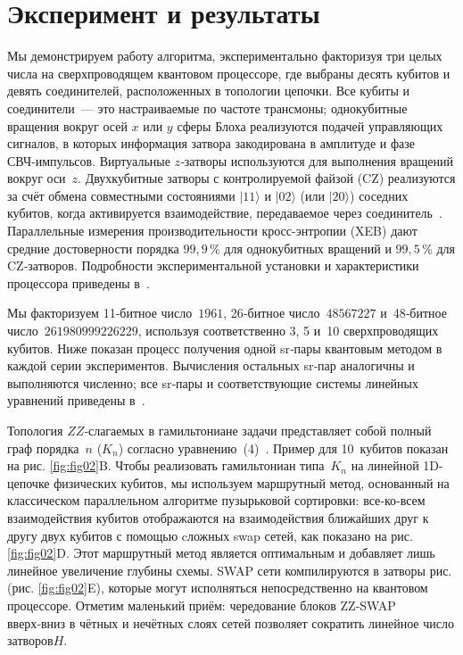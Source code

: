 \section{Эксперимент и результаты}

Мы демонстрируем работу алгоритма, экспериментально факторизуя три целых числа
на сверхпроводящем квантовом процессоре, где выбраны десять кубитов и девять
соединителей, расположенных в топологии цепочки. Все кубиты и соединители — это
настраиваемые по частоте трансмоны; однокубитные вращения вокруг осей $x$ или
$y$ сферы Блоха реализуются подачей управляющих сигналов, в которых информация
затвора закодирована в амплитуде и фазе СВЧ‑импульсов. Виртуальные $z$‑затворы
используются для выполнения вращений вокруг оси $z$. Двухкубитные затворы с
контролируемой файзой (CZ) реализуются за счёт обмена совместными состояниями
$|11\rangle$ и $|02\rangle$ (или $|20\rangle$) соседних кубитов, когда
активируется взаимодействие, передаваемое через соединитель \cite{cite_34}.
Параллельные измерения производительности кросс-энтропии (XEB) дают средние
достоверности порядка $99{,}9\,\%$ для однокубитных вращений и $99{,}5\,\%$ для
CZ‑затворов. Подробности экспериментальной установки и характеристики
процессора приведены в \cite{cite_31}.

Мы факторизуем 11‑битное число $1961$, 26‑битное число $48567227$ и 48‑битное
число $261980999226229$, используя соответственно 3, 5 и 10 сверхпроводящих
кубитов. Ниже показан процесс получения одной sr‑пары квантовым методом в
каждой серии экспериментов. Вычисления остальных sr‑пар аналогичны и
выполняются численно; все sr‑пары и соответствующие системы линейных уравнений
приведены в \cite{cite_31}.

Топология $ZZ$‑слагаемых в гамильтониане задачи представляет собой полный граф
порядка $n$ ($K_n$) согласно уравнению (4) \cite{cite_31}. Пример для
10 кубитов показан на рис. \ref{fig:fig02}B. Чтобы реализовать гамильтониан
типа $K_n$ на линейной 1D-цепочке физических кубитов, мы используем маршрутный
метод, основанный на классическом параллельном алгоритме пузырьковой
сортировки: все‑ко‑всем взаимодействия кубитов отображаются на взаимодействия
ближайших друг к другу двух кубитов с помощью cложных swap сетей, как показано
на рис. \ref{fig:fig02}D. Этот маршрутный метод является оптимальным и
добавляет лишь линейное увеличение глубины схемы. SWAP сети компилируются в
затворы рис. (рис. \ref{fig:fig02}E), которые могут исполняться непосредственно
на квантовом процессоре. Отметим маленький приём: чередование блоков ZZ‑SWAP
вверх‑вниз в чётных и нечётных слоях сетей позволяет сократить линейное число
затворов$H$.

